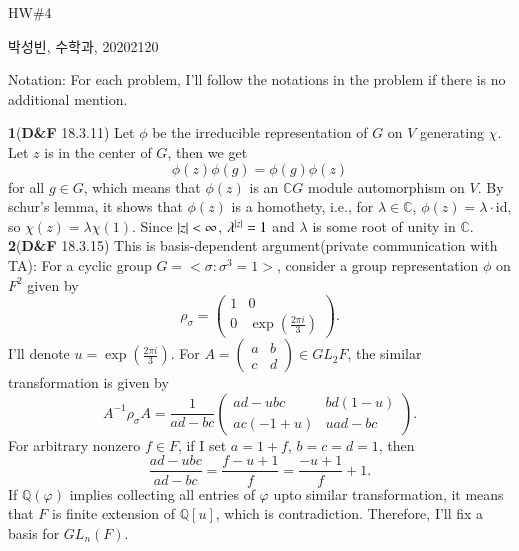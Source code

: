 \documentclass[a4paper, 12pt]{article}
\theoremstyle{Mydefinition}
\theoremstyle{Mytheorem}
\begin{document}
\thispagestyle{myfirstpage}
\begin{center}
	\Large{HW\#4}
\end{center}
박성빈, 수학과, 20202120

Notation: For each problem, I'll follow the notations in the problem if there is no additional mention.

\noindent \textbf{1}(\textbf{D\&F} 18.3.11)
Let $\phi$ be the irreducible representation of $G$ on $V$ generating $\chi$. Let $z$ is in the center of $G$, then we get
\begin{equation}
    \phi(z)\phi(g) = \phi(g)\phi(z)
\end{equation}
for all $g\in G$, which means that $\phi(z)$ is an $\mathbb{C}G$ module automorphism on $V$. By schur's lemma, it shows that $\phi(z)$ is a homothety, i.e., for $\lambda\in \mathbb{C}$, $\phi(z) = \lambda\cdot\mathrm{id}$, so $\chi(z) = \lambda\chi(1)$. Since $\abs{z}<\infty$, $\lambda^{\abs{z}}=1$ and $\lambda$ is some root of unity in $\mathbb{C}$.\\

\noindent \textbf{2}(\textbf{D\&F} 18.3.15)
This is basis-dependent argument(private communication with TA): For a cyclic group $G=<\sigma:\sigma^3 = 1>$, consider a group representation $\phi$ on $F^2$ given by
\begin{equation}
    \rho_\sigma = \begin{pmatrix}
    1 & 0\\
    0 & \exp\left(\frac{2\pi i}{3}\right)
    \end{pmatrix}.
\end{equation}
I'll denote $u = \exp\left(\frac{2\pi i}{3}\right)$. For $A = \begin{pmatrix}a & b\\ c & d\end{pmatrix}\in GL_2F$, the similar transformation is given by
\begin{equation}
    A^{-1}\rho_\sigma A = \frac{1}{ad-bc}\begin{pmatrix}
    ad-ubc & bd(1-u)\\
    ac(-1+u) & uad-bc
    \end{pmatrix}.
\end{equation}
For arbitrary nonzero $f\in F$, if I set $a=1+f$, $b=c=d=1$, then
\begin{equation}
    \frac{ad-ubc}{ad-bc} = \frac{f-u + 1}{f} = \frac{-u+1}{f} + 1.
\end{equation}
If $\mathbb{Q}(\varphi)$ implies collecting all entries of $\varphi$ upto similar transformation, it means that $F$ is finite extension of $\mathbb{Q}[u]$, which is contradiction. Therefore, I'll fix a basis for $GL_n(F)$.
\end{document}
